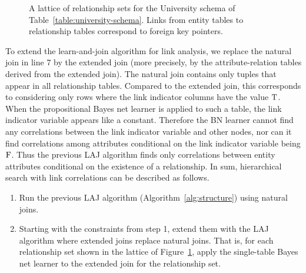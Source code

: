 \documentclass{article}
\begin{document}
\begin{figure}[h]
\begin{center}
\caption{A lattice of relationship sets for the University schema of Table~\ref{table:university-schema}. Links from entity tables to relationship tables correspond to foreign key pointers. 
\label{fig:big-lattice}}
\end{center}
\end{figure}



To extend the learn-and-join algorithm for link analysis, we replace the natural join in line 7 by the extended join (more precisely, by the attribute-relation tables derived from the extended join). The natural join contains only tuples that appear in all relationship tables. Compared to the extended join, this corresponds to considering only rows where the link indicator columns have the value $\mathrm{T}$. When the propositional Bayes net learner is applied to such a table, the link indicator variable appears like a constant. Therefore the BN learner cannot find any correlations between the link indicator variable and other nodes, nor can it find correlations among attributes conditional on the link indicator variable being $\mathrm{F}$. Thus the previous LAJ algorithm finds only correlations between entity attributes conditional on the existence of a relationship. In sum, hierarchical search with link correlations can be described as follows.

\begin{enumerate}
\item Run the previous LAJ algorithm (Algorithm~\ref{alg:structure}) using natural joins.
\item Starting with the constraints from step 1, extend them with the LAJ algorithm where extended joins replace natural joins. That is, for each relationship set shown in the lattice of Figure~\ref{fig:big-lattice}, apply the single-table Bayes net learner to the extended join for the relationship set.
\end{enumerate}
\end{document}
